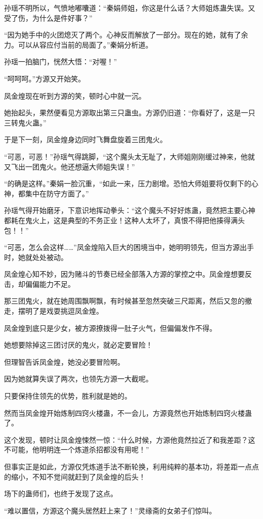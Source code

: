 \begin{this_body}
孙瑶不明所以，气愤地嘟囔道：“秦娟师姐，你这是什么话？大师姐炼蛊失误。又受了伤，为什么是件好事？”

“因为她手中的火团熄灭了两个。心神反而解放了一部分。现在的她，就有了余力。可以从容应付当前的局面了。”秦娟分析道。

孙瑶一拍脑门，恍然大悟：“对喔！”

“呵呵呵。”方源又开始笑。

凤金煌现在听到方源的笑，顿时心中就一沉。

她抬起头，果然便看见方源取出第三只蛊虫。方源仍旧道：“你看好了，这是一只三转鬼火蛊。”

于是下一刻，凤金煌身边同时飞舞盘旋着三团鬼火。

“可恶，可恶！”孙瑶气得跳脚，“这个魔头太无耻了，大师姐刚刚缓过神来，他就又飞出一团鬼火。他还想逼大师姐失误！”

“的确是这样。”秦娟一脸沉重，“如此一来，压力剧增。恐怕大师姐要将仅剩下的心神，都集中在防守方面了。”

孙瑶气得开始磨牙，下意识地挥动拳头：“这个魔头不好好炼蛊，竟然把主要心神都耗在鬼火上，这是典型的不务正业！这种人太坏了，真恨不得把他揍得满头包！！”

“可恶，怎么会这样……”凤金煌陷入巨大的困境当中，她明明领先，但当方源出手时，她就处处被动。

凤金煌心知不妙，因为赌斗的节奏已经全部落入方源的掌控之中。凤金煌想要反击，却偏偏能力不足。

那三团鬼火，就在她周围飘啊飘，有时候甚至忽然突破三尺距离，然后又忽的撤走，摆明了是戏耍挑逗凤金煌。

凤金煌到底只是少女，被方源撩拨得一肚子火气，但偏偏发作不得。

她想要除掉这三团讨厌的鬼火，就必定要冒险！

但理智告诉凤金煌，她没必要冒险啊。

因为她就算失误了两次，也领先方源一大截呢。

只要保持住领先的优势，胜利就是她的。

然而当凤金煌开始炼制四窍火楼蛊，不一会儿，方源竟然也开始炼制四窍火楼蛊了。

这个发现，顿时让凤金煌悚然一惊：“什么时候，方源他竟然拉近了和我差距？这不可能，他明明连一个炼道杀招都没有用呢！”

但事实正是如此，方源仅凭炼道手法不断轮换，利用纯粹的基本功，将差距一点点的缩小，不知不觉间就赶到了凤金煌的后头！

场下的蛊师们，也终于发现了这点。

“难以置信，方源这个魔头居然赶上来了！”灵缘斋的女弟子们惊叫。


\end{this_body}
